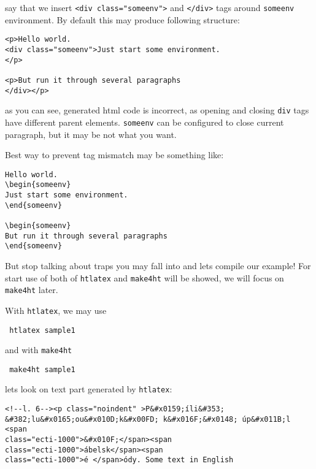 say that we insert
\texttt{\textless{}div\ class="someenv"\textgreater{}} and
\texttt{\textless{}/div\textgreater{}} tags around \texttt{someenv}
environment. By default this may produce following structure:

\begin{verbatim}
<p>Hello world.
<div class="someenv">Just start some environment.
</p>

<p>But run it through several paragraphs
</div></p>
\end{verbatim}

as you can see, generated html code is incorrect, as opening and closing
\texttt{div} tags have different parent elements. \texttt{someenv} can
be configured to close current paragraph, but it may be not what you
want.

Best way to prevent tag mismatch may be something like:

\begin{verbatim}
Hello world.
\begin{someenv}
Just start some environment.
\end{someenv}

\begin{someenv}
But run it through several paragraphs
\end{someenv}
\end{verbatim}

But stop talking about traps you may fall into and lets compile our
example! For start use of both of \texttt{htlatex} and \texttt{make4ht}
will be showed, we will focus on \texttt{make4ht} later.

With \texttt{htlatex}, we may use

\begin{verbatim}
 htlatex sample1
\end{verbatim}

and with \texttt{make4ht}

\begin{verbatim}
 make4ht sample1
\end{verbatim}

lets look on text part generated by \texttt{htlatex}:

\begin{verbatim}
<!--l. 6--><p class="noindent" >P&#x0159;íli&#353; &#382;lu&#x0165;ou&#x010D;k&#x00FD; k&#x016F;&#x0148; úp&#x011B;l <span 
class="ecti-1000">&#x010F;</span><span 
class="ecti-1000">ábelsk</span><span 
class="ecti-1000">é </span>ódy. Some text in English
\end{verbatim}

